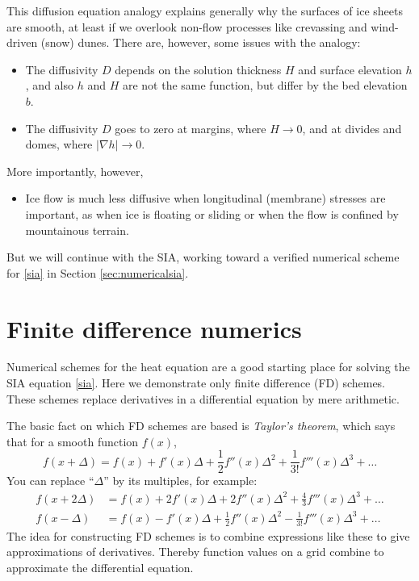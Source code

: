 \documentclass[letterpaper,final,12pt,reqno]{amsart}
\newcommand{\grad}{\nabla}
\begin{document}
This diffusion equation analogy explains generally why the surfaces of ice sheets are smooth, at least if we overlook non-flow processes like crevassing and wind-driven (snow) dunes.  There are, however, some issues with the analogy:
\begin{itemize}
\item The diffusivity $D$ depends on the solution thickness $H$ and surface elevation $h$, and also $h$ and $H$ are not the same function, but differ by the bed elevation $b$.
\item The diffusivity $D$ goes to zero at margins, where $H\to 0$, and at divides and domes, where $|\grad h|\to 0$.
\end{itemize}
More importantly, however,
\begin{itemize}
\item Ice flow is much less diffusive when longitudinal (membrane) stresses are important, as when ice is floating or sliding or when the flow is confined by mountainous terrain.
\end{itemize}
But we will continue with the SIA, working toward a verified numerical scheme for \eqref{sia} in Section \ref{sec:numericalsia}.

\section{Finite difference numerics} 

Numerical schemes for the heat equation are a good starting place for solving the SIA equation \eqref{sia}.  Here we demonstrate only finite difference (FD) schemes.  These schemes replace derivatives in a differential equation by mere arithmetic.

The basic fact on which FD schemes are based is \emph{Taylor's theorem}, which says that for a smooth function $f(x)$,
	$$f(x+\Delta) = f(x) + f'(x) \Delta + \frac{1}{2} f''(x) \Delta^2 + \frac{1}{3!} f'''(x) \Delta^3 + \dots$$
You can replace ``$\Delta$'' by its multiples, for example:
\begin{align*}
f(x+2\Delta) &= f(x) + 2 f'(x) \Delta + 2 f''(x) \Delta^2 + \frac{4}{3} f'''(x) \Delta^3 + \dots \\
f(x-\Delta) &= f(x) - f'(x) \Delta + \frac{1}{2} f''(x) \Delta^2 - \frac{1}{3!} f'''(x) \Delta^3 + \dots
\end{align*}
The idea for constructing FD schemes is to combine expressions like these to give approximations of derivatives.  Thereby function values on a grid combine to approximate the differential equation.
\end{document}
